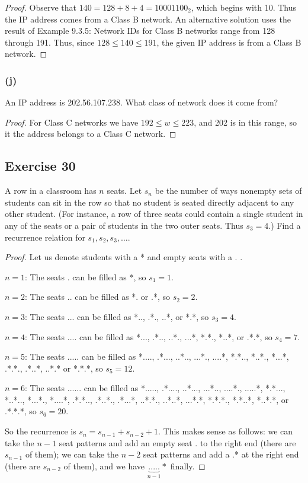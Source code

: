 \documentclass[14pt]{extarticle}
\begin{document}
\begin{proof}
     Observe that \(140 = 128 + 8 + 4 = 10001100_2\), which begins with 10. Thus the IP address comes from a Class B
     network. An alternative solution uses the result of Example 9.3.5: Network IDs for Class B networks range from 128
     through 191. Thus, since \(128 \leq 140 \leq 191\), the given IP address is from a Class B network.
\end{proof}

\subsubsection{(j)}
An IP address is 202.56.107.238. What class of network does it come from?

\begin{proof}
     For Class C networks we have \(192 \leq w \leq 223\), and 202 is in this range, so it the address belongs to a Class
     C network.
\end{proof}

\subsection{Exercise 30}
A row in a classroom has $n$ seats. Let \(s_n\) be the number of ways nonempty sets of students can sit in the row
so that no student is seated directly adjacent to any other student. (For instance, a row of three seats could contain
a single student in any of the seats or a pair of students in the two outer seats. Thus \(s_3 = 4\).) Find a
recurrence relation for \(s_1, s_2, s_3, \ldots\).

\begin{proof}
     Let us denote students with a * and empty seats with a . .

     $n=1$: The seats . can be filled as *, so \(s_1 = 1\).

     $n=2$: The seats .. can be filled as *. or .*, so \(s_2 = 2\).

     $n=3$: The seats ... can be filled as *.., .*., ..*, or *.*, so \(s_3 = 4\).

     $n=4$: The seats .... can be filled as *..., .*.., ..*., ...*, *.*., *..*, or .*.*, so \(s_4 = 7\).

     $n=5$: The seats ..... can be filled as *...., .*..., ..*.., ...*., ....*, *.*.., *..*., *...*, .*.*., .*..*,
     ..*.*  or *.*.*, so \(s_5 = 12\).

     $n=6$: The seats ...... can be filled as *....., .*...., ..*..., ...*.., ....*., .....*, *.*..., *..*.., *...*., *....*, .*.*.., .*..*., .*...*, ..*.*., ..*..*, ...*.*, *.*.*., *.*..*, *..*.*, or .*.*.*, so \(s_6 = 20\).

     So the recurrence is \(s_n = s_{n-1}+s_{n-2}+1\). This makes sense as follows: we can take the $n-1$ seat patterns
     and add an empty seat . to the right end (there are \(s_{n-1}\) of them); we can take the $n-2$ seat patterns
     and add a .* at the right end (there are \(s_{n-2}\) of them), and we have \(\underbrace{.....}_{n-1}*\) finally.
\end{proof}
\end{document}
